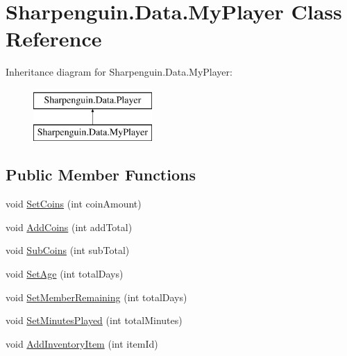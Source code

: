 \hypertarget{classSharpenguin_1_1Data_1_1MyPlayer}{\section{Sharpenguin.\-Data.\-My\-Player Class Reference}
\label{classSharpenguin_1_1Data_1_1MyPlayer}
}
Inheritance diagram for Sharpenguin.\-Data.\-My\-Player\-:\begin{figure}[H]
\begin{center}
\leavevmode
\includegraphics[height=2.000000cm]{classSharpenguin_1_1Data_1_1MyPlayer}
\end{center}
\end{figure}
\subsection*{Public Member Functions}
\begin{DoxyCompactItemize}
\item 
void \hyperlink{classSharpenguin_1_1Data_1_1MyPlayer_a7c6ae02df5a0ae641334476ec006a8e6}{Set\-Coins} (int coin\-Amount)
\item 
void \hyperlink{classSharpenguin_1_1Data_1_1MyPlayer_aeb44bb50999e60840b40332f2d0dc46b}{Add\-Coins} (int add\-Total)
\item 
void \hyperlink{classSharpenguin_1_1Data_1_1MyPlayer_a0fd8844c00e98e02bd7a189b04f248d2}{Sub\-Coins} (int sub\-Total)
\item 
void \hyperlink{classSharpenguin_1_1Data_1_1MyPlayer_a4896f30067506d8fa77f61293bed7444}{Set\-Age} (int total\-Days)
\item 
void \hyperlink{classSharpenguin_1_1Data_1_1MyPlayer_a84c976af85d5fb48f8137e6f047c823b}{Set\-Member\-Remaining} (int total\-Days)
\item 
void \hyperlink{classSharpenguin_1_1Data_1_1MyPlayer_a9e96ff952268372d8b43cbde269b58d5}{Set\-Minutes\-Played} (int total\-Minutes)
\item 
void \hyperlink{classSharpenguin_1_1Data_1_1MyPlayer_ad9bf7d1039275986d48cb2c0c11144ac}{Add\-Inventory\-Item} (int item\-Id)
\end{DoxyCompactItemize}
